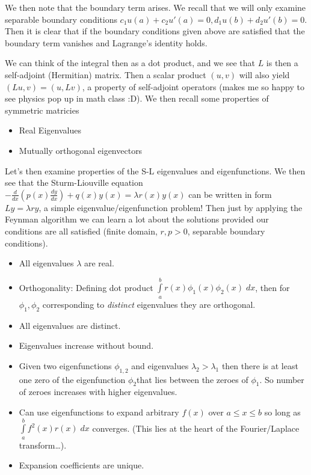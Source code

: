 \documentclass[10pt]{report}
\newcommand{\rd}[2]{\frac{d#1}{d#2}}
\begin{document}
We then note that the boundary term arises. We recall that we will only examine separable boundary conditions $c_1u(a) + c_2u'(a) = 0, d_1u(b) + d_2u'(b) = 0$. Then it is clear that if the boundary conditions given above are satisfied that the boundary term vanishes and Lagrange's identity holds.

We can think of the integral then as a dot product, and we see that $L$ is then a self-adjoint (Hermitian) matrix. Then a scalar product $(u,v)$ will also yield $(Lu,v) = (u,Lv)$, a property of self-adjoint operators (makes me so happy to see physics pop up in math class :D). We then recall some properties of symmetric matricies
\begin{itemize}
    \item Real Eigenvalues
    \item Mutually orthogonal eigenvectors
\end{itemize}

Let's then examine properties of the S-L eigenvalues and eigenfunctions. We then see that the Sturm-Liouville equation $-\rd{}{x}\left( p(x)\rd{y}{x} \right) + q(x)y(x) = \lambda r(x)y(x)$ can be written in form $Ly = \lambda ry$, a simple eigenvalue/eigenfunction problem! Then just by applying the Feynman algorithm we can learn a lot about the solutions provided our conditions are all satisfied (finite domain, $r,p > 0$, separable boundary conditions).

\begin{itemize}
    \item All eigenvalues $\lambda$ are real.
    \item Orthogonality: Defining dot product $\displaystyle\int\limits_{a}^{b}r(x) \phi_1(x)\phi_2(x)\;dx$, then for $\phi_1, \phi_2$ corresponding to \emph{distinct} eigenvalues they are orthogonal. 
    \item All eigenvalues are distinct.
    \item Eigenvalues increase without bound.
    \item Given two eigenfunctions $\phi_{1,2}$ and eigenvalues $\lambda_2 > \lambda_1$ then there is at least one zero of the eigenfunction $\phi_2$that lies between the zeroes of $\phi_1$. So number of zeroes increases with higher eigenvalues.
    \item Can use eigenfunctions to expand arbitrary $f(x)$ over $a \leq x \leq b$ so long as $\displaystyle\int\limits_{a}^{b}f^2(x)r(x)\;dx$ converges. (This lies at the heart of the Fourier/Laplace transform\dots). 
    \item Expansion coefficients are unique.
\end{itemize}
\end{document}

